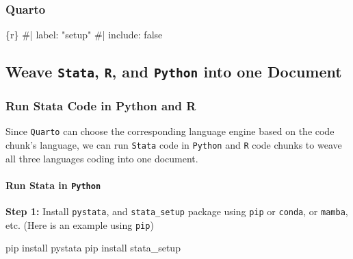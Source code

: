 \documentclass[
  letterpaper,
  DIV=11,
  numbers=noendperiod]{scrartcl}
\let\oldparagraph\paragraph
\renewcommand{\paragraph}[1]{\oldparagraph{#1}\mbox{}}
\newenvironment{Shaded}{\begin{snugshade}}{\end{snugshade}}
\newcommand{\AttributeTok}[1]{\textcolor[rgb]{0.40,0.45,0.13}{#1}}
\newcommand{\NormalTok}[1]{\textcolor[rgb]{0.00,0.23,0.31}{#1}}
\newcommand{\StringTok}[1]{\textcolor[rgb]{0.13,0.47,0.30}{#1}}
\begin{document}
\subsubsection{Quarto}

\begin{Shaded}
\begin{Highlighting}[]
    \StringTok{\textasciigrave{}\textasciigrave{}\textasciigrave{}}\AttributeTok{\{r\}}
\AttributeTok{    \#| label: "setup"}
\AttributeTok{    \#| include: false}
\AttributeTok{    }\StringTok{\textasciigrave{}\textasciigrave{}\textasciigrave{}}
\end{Highlighting}
\end{Shaded}

\hypertarget{weave-stata-r-and-python-into-one-document}{%
\subsection{\texorpdfstring{Weave \texttt{Stata}, \texttt{R}, and
\texttt{Python} into one
Document}{Weave Stata, R, and Python into one Document}}\label{weave-stata-r-and-python-into-one-document}}

\hypertarget{run-stata-code-in-python-and-r}{%
\subsubsection{Run Stata Code in Python and
R}\label{run-stata-code-in-python-and-r}}

Since \texttt{Quarto} can choose the corresponding language engine based
on the code chunk's language, we can run \texttt{Stata} code in
\texttt{Python} and \texttt{R} code chunks to weave all three languages
coding into one document.

\paragraph{\texorpdfstring{Run Stata in
\texttt{Python}}{Run Stata in Python}}

\textbf{Step 1:} Install \texttt{pystata}, and \texttt{stata\_setup}
package using \texttt{pip} or \texttt{conda}, or \texttt{mamba}, etc.
(Here is an example using \texttt{pip})

\begin{Shaded}
\begin{Highlighting}[]
\NormalTok{pip install pystata}
\NormalTok{pip install stata\_setup}
\end{Highlighting}
\end{Shaded}
\end{document}
